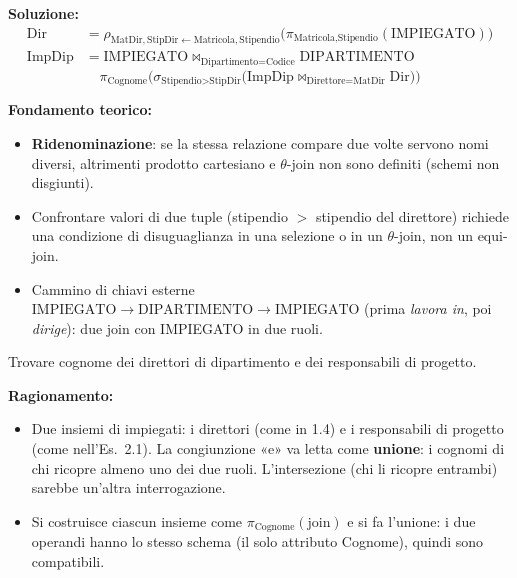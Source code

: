 \documentclass[12pt, a4paper]{article}
\begin{document}
\textbf{Soluzione:}
\begin{align*}
\text{Dir} &= \rho_{\text{MatDir},\text{StipDir}\leftarrow\text{Matricola},\text{Stipendio}}\big(\pi_{\text{Matricola},\text{Stipendio}}(\text{IMPIEGATO})\big)\\
\text{ImpDip} &= \text{IMPIEGATO}\bowtie_{\text{Dipartimento}=\text{Codice}}\text{DIPARTIMENTO}
\end{align*}
$$\pi_{\text{Cognome}}\Big(\sigma_{\text{Stipendio}>\text{StipDir}}\big(\text{ImpDip}\bowtie_{\text{Direttore}=\text{MatDir}}\text{Dir}\big)\Big)$$

\textbf{Fondamento teorico:}
\begin{itemize}
\item \textbf{Ridenominazione}: se la stessa relazione compare due volte servono nomi diversi, altrimenti prodotto cartesiano e $\theta$-join non sono definiti (schemi non disgiunti).
\item Confrontare valori di due tuple (stipendio $>$ stipendio del direttore) richiede una condizione di disuguaglianza in una selezione o in un $\theta$-join, non un equi-join.
\item Cammino di chiavi esterne $\text{IMPIEGATO}\to\text{DIPARTIMENTO}\to\text{IMPIEGATO}$ (prima \emph{lavora in}, poi \emph{dirige}): due join con IMPIEGATO in due ruoli.
\end{itemize}

\begin{tcolorbox}[colback=lightergray!10, colframe=tocsec, title=\textbf{Esercizio 1.8}]
Trovare cognome dei direttori di dipartimento e dei responsabili di progetto.
\end{tcolorbox}

\textbf{Ragionamento:}
\begin{itemize}
\item Due insiemi di impiegati: i direttori (come in 1.4) e i responsabili di progetto (come nell'Es.~2.1). La congiunzione «e» va letta come \textbf{unione}: i cognomi di chi ricopre almeno uno dei due ruoli. L'intersezione (chi li ricopre entrambi) sarebbe un'altra interrogazione.
\item Si costruisce ciascun insieme come $\pi_{\text{Cognome}}(\text{join})$ e si fa l'unione: i due operandi hanno lo stesso schema (il solo attributo Cognome), quindi sono compatibili.
\end{itemize}
\end{document}
